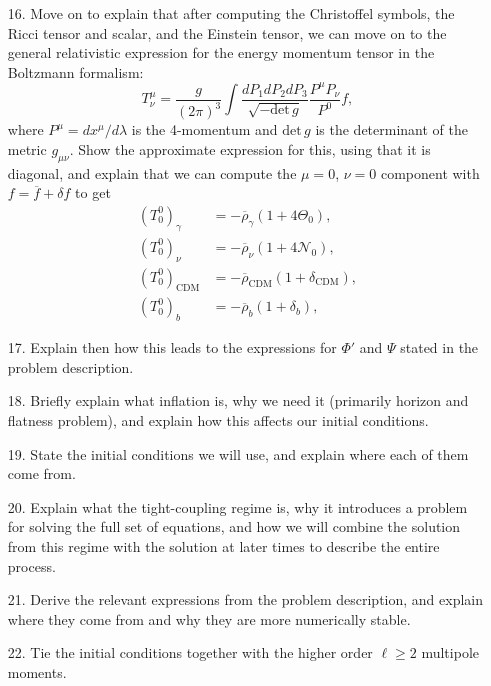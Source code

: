 \documentclass{aa}
\begin{document}
\begin{enumerate}
  \item [16.] Move on to explain that after computing the Christoffel symbols, the Ricci tensor and scalar, and the Einstein tensor, we can move on to the general relativistic expression for the energy momentum tensor in the Boltzmann formalism:
  \begin{equation}
    T_\nu^\mu = \frac{g}{(2\pi)^3}\int\frac{dP_1dP_2dP_3}{\sqrt{-\text{det}\,g}}\frac{P^\mu P_\nu}{P^0}f,
  \end{equation}
  where $P^\mu=dx^\mu/d\lambda$ is the 4-momentum and $\text{det}\,g$ is the determinant of the metric $g_{\mu\nu}$. Show the approximate expression for this, using that it is diagonal, and explain that we can compute the $\mu=0$, $\nu=0$ component with $f=\overline{f}+\delta f$ to get
  \begin{align}
    \left(T_0^0\right)_\gamma &= -\overline{\rho}_\gamma\left(1+4\Theta_0\right),
    \\
    \left(T_0^0\right)_\nu &= -\overline{\rho}_\nu\left(1+4\mathcal{N}_0\right),
    \\
    \left(T_0^0\right)_\text{CDM} &= -\overline{\rho}_\text{CDM}\left(1+\delta_\text{CDM}\right),
    \\
    \left(T_0^0\right)_b &= -\overline{\rho}_b\left(1+\delta_b\right),
  \end{align}
  \item [17.] Explain then how this leads to the expressions for $\Phi'$ and $\Psi$ stated in the problem description. 
  \item [18.] Briefly explain what inflation is, why we need it (primarily horizon and flatness problem), and explain how this affects our initial conditions.
  \item [19.] State the initial conditions we will use, and explain where each of them come from.
  \item [20.] Explain what the tight-coupling regime is, why it introduces a problem for solving the full set of equations, and how we will combine the solution from this regime with the solution at later times to describe the entire process. 
  \item [21.] Derive the relevant expressions from the problem description, and explain where they come from and why they are more numerically stable.
  \item [22.] Tie the initial conditions together with the higher order $\ell\geq2$ multipole moments.
\end{enumerate}

\end{document}
